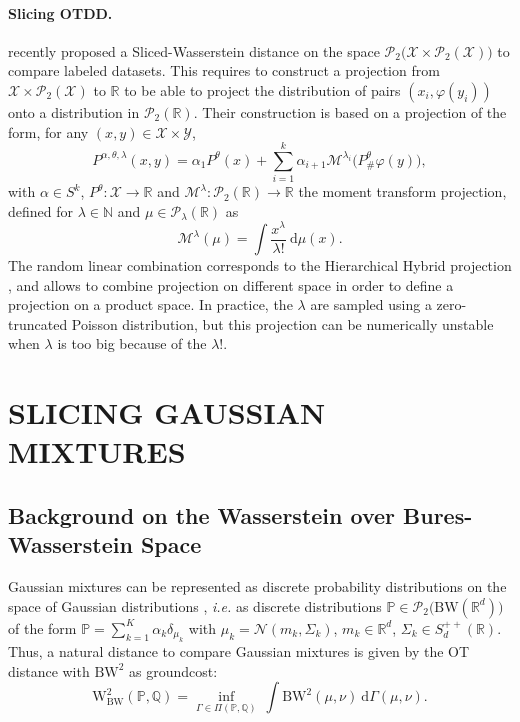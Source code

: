 \documentclass[twoside]{article}
\newcommand{\cP}{\mathcal{P}}
\newcommand{\bP}{\mathbb{P}}
\newcommand{\bQ}{\mathbb{Q}}
\newcommand{\cN}{\mathcal{N}}
\newcommand{\cX}{\mathcal{X}}
\newcommand{\cY}{\mathcal{Y}}
\newcommand{\cM}{\mathcal{M}}
\newcommand{\cPBW}{\mathcal{P}_2\big(\bw(\R^d)\big)}
\newcommand{\cPProd}[1]{\mathcal{P}_2\big(#1 \times \cP_2(#1)\big)}
\newcommand{\W}{\mathrm{W}}
\newcommand{\R}{\mathbb{R}}
\newcommand{\bw}{\mathrm{BW}}
\begin{document}
\paragraph{Slicing OTDD.}

\citet{nguyen2025lightspeed} recently proposed a Sliced-Wasserstein distance on the space $\cPProd{\cX}$ to compare labeled datasets. This requires to construct a projection from $\cX\times\cP_2(\cX)$ to $\R$ to be able to project the distribution of pairs $(x_i,\varphi(y_i))$ onto a distribution in $\cP_2(\R)$. Their construction is based on a projection of the form, for any $(x,y)\in \cX\times \cY$,
\begin{equation}
    P^{\alpha,\theta,\lambda}(x,y) = \alpha_1 P^\theta(x) + \sum_{i=1}^k \alpha_{i+1} \cM^{\lambda_i}\big(P^\theta_\#\varphi(y)\big),
\end{equation}
with $\alpha\in S^{k}$, $P^\theta:\cX\to \R$ and $\cM^\lambda:\cP_2(\R)\to \R$ the moment transform projection, defined for $\lambda\in \mathbb{N}$ and $\mu\in\cP_\lambda(\R)$ as
\begin{equation}
    \cM^{\lambda}(\mu) = \int \frac{x^\lambda}{\lambda!}\ \mathrm{d}\mu(x).
\end{equation}
The random linear combination corresponds to the Hierarchical Hybrid projection \citep{nguyen2024hierarchical}, and allows to combine projection on different space in order to define a projection on a product space. In practice, the $\lambda$ are sampled using a zero-truncated Poisson distribution, but this projection can be numerically unstable when $\lambda$ is too big because of the $\lambda!$.






\section{SLICING GAUSSIAN MIXTURES} \label{appendix:sliced_gm}

\subsection{Background on the Wasserstein over Bures-Wasserstein Space}

Gaussian mixtures can be represented as discrete probability distributions on the space of Gaussian distributions \citep{chen2018optimal, delon2020wasserstein}, \emph{i.e.} as discrete distributions $\bP\in\cPBW$ of the form $\bP=\sum_{k=1}^K \alpha_k \delta_{\mu_k}$ with $\mu_k=\cN(m_k,\Sigma_k)$, $m_k\in \R^d$, $\Sigma_k\in S_d^{++}(\R)$. 
Thus, a natural distance to compare Gaussian mixtures is given by the OT distance with $\bw^2$ as groundcost:
\begin{equation}
    \W_{\bw}^2(\bP, \bQ) = \inf_{\Gamma\in\Pi(\bP,\bQ)}\ \int \bw^2(\mu,\nu)\ \mathrm{d}\Gamma(\mu,\nu).
\end{equation}
\end{document}
